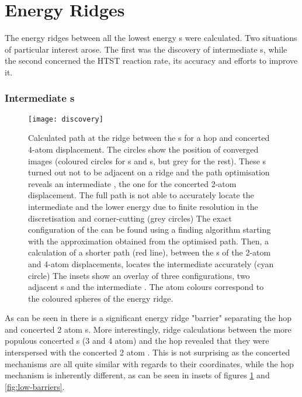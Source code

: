 \section{Energy Ridges}
\label{al-energy-ridges}

The energy ridges between all the lowest energy s were calculated.
Two situations of particular interest arose.
The first was the discovery of intermediate s, while the second concerned the HTST reaction rate, its accuracy and efforts to improve it.

\subsubsection{Intermediate s}
\begin{figure}[hp]
\begin{center}
\texttt{[image: discovery]}
    \parbox{0.85\linewidth}{
\caption{
Calculated path at the ridge between the s for a hop and concerted 4-atom displacement.
The circles show the position of converged images (coloured circles for s and s, but grey for the rest). 
These s turned out not to be adjacent on a ridge and the path optimisation reveals an intermediate , the one for the concerted 2-atom displacement.
The full path is not able to accurately locate the intermediate  and the lower energy  due to finite resolution in the discretisation and corner-cutting (grey circles)
The exact configuration of the  can be found using a  finding algorithm starting with the approximation obtained from the optimised path.
Then, a calculation of a shorter path (red line), between the s of the 2-atom and 4-atom displacements, locates the intermediate  accurately (cyan circle)
The insets show an overlay of three configurations, two adjacent s and the intermediate .
The atom colours correspond to the coloured spheres of the energy ridge.
}
\label{fig:discovery}
}
\end{center}
\end{figure}

As can be seen in  there is a significant energy ridge "barrier" separating the hop and concerted 2 atom s.
More interestingly, ridge calculations between the more populous concerted s (3 and 4 atom) and the hop revealed that they were interspersed with the concerted 2 atom .
This is not surprising as the concerted mechanisms are all quite similar with regards to their coordinates, while the hop mechanism is inherently different, as can be seen in insets of figures \ref{fig:discovery} and \ref{fig:low-barriers}.

